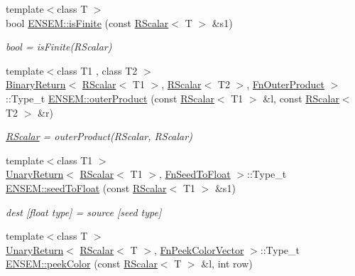 \begin{DoxyCompactItemize}
{\footnotesize template$<$class T $>$ }\\bool \mbox{\hyperlink{group__rscalar_ga7ec54fb1eaedacb87a42df35a5f11001}{E\+N\+S\+E\+M\+::is\+Finite}} (const \mbox{\hyperlink{classENSEM_1_1RScalar}{R\+Scalar}}$<$ T $>$ \&s1)
\begin{DoxyCompactList}\small\item\em bool = is\+Finite(\+R\+Scalar) \end{DoxyCompactList}\item 
{\footnotesize template$<$class T1 , class T2 $>$ }\\\mbox{\hyperlink{structENSEM_1_1BinaryReturn}{Binary\+Return}}$<$ \mbox{\hyperlink{classENSEM_1_1RScalar}{R\+Scalar}}$<$ T1 $>$, \mbox{\hyperlink{classENSEM_1_1RScalar}{R\+Scalar}}$<$ T2 $>$, \mbox{\hyperlink{structENSEM_1_1FnOuterProduct}{Fn\+Outer\+Product}} $>$\+::Type\+\_\+t \mbox{\hyperlink{group__rscalar_ga15f13b29160f342d113127c8d71db613}{E\+N\+S\+E\+M\+::outer\+Product}} (const \mbox{\hyperlink{classENSEM_1_1RScalar}{R\+Scalar}}$<$ T1 $>$ \&l, const \mbox{\hyperlink{classENSEM_1_1RScalar}{R\+Scalar}}$<$ T2 $>$ \&r)
\begin{DoxyCompactList}\small\item\em \mbox{\hyperlink{classENSEM_1_1RScalar}{R\+Scalar}} = outer\+Product(\+R\+Scalar, R\+Scalar) \end{DoxyCompactList}\item 
{\footnotesize template$<$class T1 $>$ }\\\mbox{\hyperlink{structENSEM_1_1UnaryReturn}{Unary\+Return}}$<$ \mbox{\hyperlink{classENSEM_1_1RScalar}{R\+Scalar}}$<$ T1 $>$, \mbox{\hyperlink{structENSEM_1_1FnSeedToFloat}{Fn\+Seed\+To\+Float}} $>$\+::Type\+\_\+t \mbox{\hyperlink{group__rscalar_gaaeb1321ab6946f99106e2a50f9098353}{E\+N\+S\+E\+M\+::seed\+To\+Float}} (const \mbox{\hyperlink{classENSEM_1_1RScalar}{R\+Scalar}}$<$ T1 $>$ \&s1)
\begin{DoxyCompactList}\small\item\em dest \mbox{[}float type\mbox{]} = source \mbox{[}seed type\mbox{]} \end{DoxyCompactList}\item 
{\footnotesize template$<$class T $>$ }\\\mbox{\hyperlink{structENSEM_1_1UnaryReturn}{Unary\+Return}}$<$ \mbox{\hyperlink{classENSEM_1_1RScalar}{R\+Scalar}}$<$ T $>$, \mbox{\hyperlink{structENSEM_1_1FnPeekColorVector}{Fn\+Peek\+Color\+Vector}} $>$\+::Type\+\_\+t \mbox{\hyperlink{group__rscalar_ga9ab62185b545eeb3c9cad28b0c200430}{E\+N\+S\+E\+M\+::peek\+Color}} (const \mbox{\hyperlink{classENSEM_1_1RScalar}{R\+Scalar}}$<$ T $>$ \&l, int row)

\end{DoxyCompactItemize}
